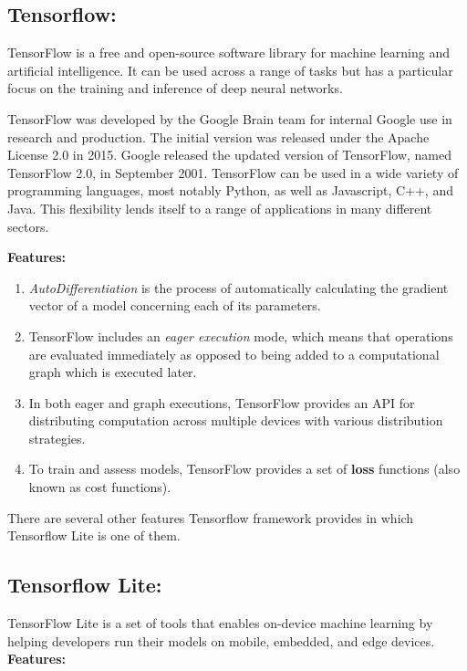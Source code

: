 \subsection{Tensorflow:}

TensorFlow is a free and open-source software library for machine learning and artificial intelligence. It can be used across a range of tasks but has a particular focus on the training and inference of deep neural networks.

TensorFlow was developed by the Google Brain team for internal Google use in research and production. The initial version was released under the Apache License 2.0 in 2015. Google released the updated version of TensorFlow, named TensorFlow 2.0, in September 2001. TensorFlow can be used in a wide variety of programming languages, most notably Python, as well as Javascript, C++, and Java. This flexibility lends itself to a range of applications in many different sectors.

\textbf{Features:}

\begin{enumerate}
  \item \textit{AutoDifferentiation} is the process of automatically calculating the gradient vector of a model concerning each of its parameters. 
  \item TensorFlow includes an \textit{eager execution} mode, which means that operations are evaluated immediately as opposed to being added to a computational graph which is executed later.
  \item In both eager and graph executions, TensorFlow provides an API for distributing computation across multiple devices with various distribution strategies. 
  \item To train and assess models, TensorFlow provides a set of \textbf{loss} functions (also known as cost functions).
\end{enumerate}

There are several other features Tensorflow framework provides in which Tensorflow Lite is one of them. 

\subsection{Tensorflow Lite:}
TensorFlow Lite is a set of tools that enables on-device machine learning by helping developers run their models on mobile, embedded, and edge devices.
\break\break
\textbf{Features:} 

